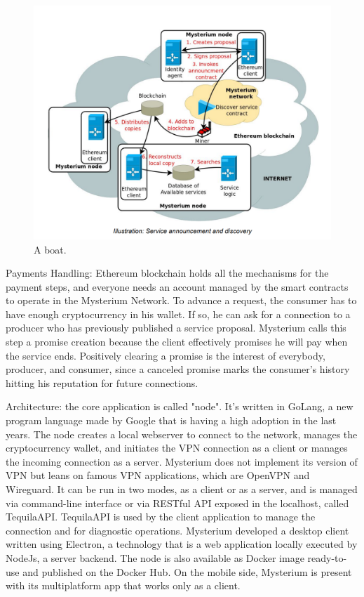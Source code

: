 \documentclass[]{article}
\begin{document}
	
	\begin{figure}
		\includegraphics[width=\linewidth]{"images/mysterium_service_announcement.png"}
		\caption{A boat.}
		\label{fig:boat1}
	\end{figure}

	
	Payments Handling: Ethereum blockchain holds all the mechanisms for the payment steps, and everyone needs an account managed by the smart contracts to operate in the Mysterium Network. To advance a request, the consumer has to have enough cryptocurrency in his wallet. If so, he can ask for a connection to a producer who has previously published a service proposal. Mysterium calls this step a promise creation because the client effectively promises he will pay when the service ends.  Positively clearing a promise is the interest of everybody, producer, and consumer, since a canceled promise marks the consumer's history hitting his reputation for future connections.


	Architecture: the core application is called "node". It's written in GoLang, a new program language made by Google that is having a high adoption in the last years. The node creates a local webserver to connect to the network, manages the cryptocurrency wallet, and initiates the VPN connection as a client or manages the incoming connection as a server. Mysterium does not implement its version of VPN but leans on famous VPN applications, which are OpenVPN and Wireguard. 
	It can be run in two modes, as a client or as a server, and is managed via command-line interface or via RESTful API exposed in the localhost, called TequilaAPI. TequilaAPI is used by the client application to manage the connection and for diagnostic operations. Mysterium developed a desktop client written using Electron, a technology that is a web application locally executed by NodeJs, a server backend.
	The node is also available as Docker image ready-to-use and published on the Docker Hub. 
	On the mobile side, Mysterium is present with its multiplatform app that works only as a client.
\end{document}
